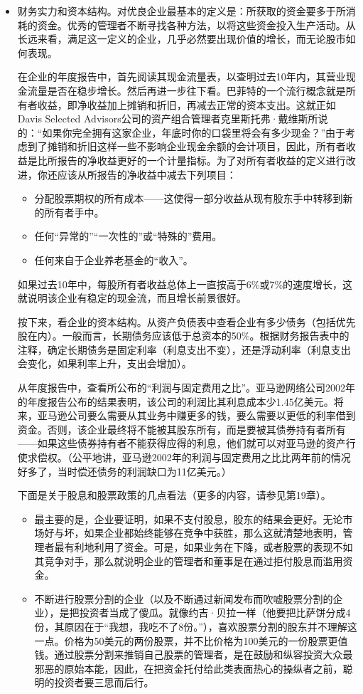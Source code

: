 \documentclass[12pt,oneside]{book}
\begin{document}
\begin{itemize}
\item 财务实力和资本结构。对优良企业最基本的定义是：所获取的资金要多于所消耗的资金。优秀的管理者不断寻找各种方法，以将这些资金投入生产活动。从长远来看，满足这一定义的企业，几乎必然要出现价值的增长，而无论股市如何表现。

在企业的年度报告中，首先阅读其现金流量表，以查明过去10年内，其营业现金流量是否在稳步增长。然后再进一步往下看。巴菲特的一个流行概念就是所有者收益，即净收益加上摊销和折旧，再减去正常的资本支出。这就正如Davis Selected Advisors公司的资产组合管理者克里斯托弗·戴维斯所说的：“如果你完全拥有这家企业，年底时你的口袋里将会有多少现金？”由于考虑到了摊销和折旧这样一些不影响企业现金余额的会计项目，因此，所有者收益是比所报告的净收益更好的一个计量指标。为了对所有者收益的定义进行改进，你还应该从所报告的净收益中减去下列项目：

\begin{itemize}
\item 分配股票期权的所有成本——这使得一部分收益从现有股东手中转移到新的所有者手中。
\item 任何“异常的”“一次性的”或“特殊的”费用。
\item 任何来自于企业养老基金的“收入”。
\end{itemize}
如果过去10年中，每股所有者收益总体上一直按高于6\%或7\%的速度增长，这就说明该企业有稳定的现金流，而且增长前景很好。

按下来，看企业的资本结构。从资产负债表中查看企业有多少债务（包括优先股在内）。一般而言，长期债务应该低于总资本的50\%。根据财务报告表中的注释，确定长期债务是固定利率（利息支出不变），还是浮动利率（利息支出会变化，如果利率上升，支出会增加）。

从年度报告中，查看所公布的“利润与固定费用之比”。亚马逊网络公司2002年的年度报告公布的结果表明，该公司的利润比其利息成本少1.45亿美元。将来，亚马逊公司要么需要从其业务中赚更多的钱，要么需要以更低的利率借到资金。否则，该企业最终将不能被其股东所有，而是要被其债券持有者所有——如果这些债券持有者不能获得应得的利息，他们就可以对亚马逊的资产行使求偿权。（公平地讲，亚马逊2002年的利润与固定费用之比比两年前的情况好多了，当时偿还债务的利润缺口为11亿美元。）

下面是关于股息和股票政策的几点看法（更多的内容，请参见第19章）。

\begin{itemize}
\item 最主要的是，企业要证明，如果不支付股息，股东的结果会更好。无论市场好与坏，如果企业都始终能够在竞争中获胜，那么这就清楚地表明，管理者最有利地利用了资金。可是，如果业务在下降，或者股票的表现不如其竞争对手，那么就说明企业的管理者和董事是在通过拒付股息而滥用资金。
\item 不断进行股票分割的企业（以及不断通过新闻发布而吹嘘股票分割的企业），是把投资者当成了傻瓜。就像约吉·贝拉一样（他要把比萨饼分成4份，其原因在于“我想，我吃不了8份。”），喜欢股票分割的股东并不理解这一点。价格为50美元的两份股票，并不比价格为100美元的一份股票更值钱。通过股票分割来推销自己股票的管理者，是在鼓励和纵容投资大众最邪恶的原始本能，因此，在把资金托付给此类表面热心的操纵者之前，聪明的投资者要三思而后行。


\end{itemize}
\end{itemize}
\end{document}
